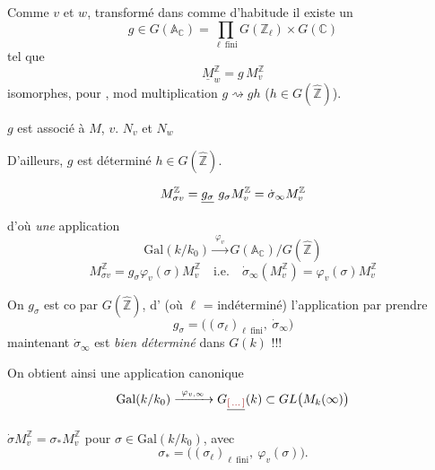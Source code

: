 \documentclass[11pt,a4paper]{article}
\begin{document}

Comme \ill{} $v$ et $w$, \ill{} transformé dans  comme d'habitude
\ill{} il existe un
\[
  g \in G(\mathbb{A}_{\mathbb{C}}) = \prod_{\ell\ \mathrm{fini}} G(\mathbb{Z}_{\ell}) \times G(\mathbb{C})
\]
 tel que
\[
  \underline{M}^{\mathbb{Z}}_{w} = g\, M^{\mathbb{Z}}_{v}
\]
 \ill{} isomorphes, \ill{} pour \ill{}, mod
multiplication $g \rightsquigarrow gh$ ($h \in G(\widehat{\mathbb{Z}})$).

$g$ est \ill{} associé à $M$, $v$. \ill{} $N_{v}$ et $N_{w}$ \ill{}

D'ailleurs, $g$ est déterminé \ill{} $h \in G(\widehat{\mathbb{Z}})$.


\[
  M^{\mathbb{Z}}_{\sigma v} = \struck{g_{\sigma}}\ g_{\sigma} M^{\mathbb{Z}}_{v}
  = \dot\sigma_{\infty} M^{\mathbb{Z}}_{v}
\]
d'où \ill{} \emph{une} application
\[
  \mathrm{Gal}(k/k_{0}) \xrightarrow{\ \varphi_{v}\ } G(\mathbb{A}_{\mathbb{C}})/G(\widehat{\mathbb{Z}})
\]
\[
  M^{\mathbb{Z}}_{\sigma v} = g_{\sigma} \varphi_{v}(\sigma) M^{\mathbb{Z}}_{v}
  \quad\text{i.e.}\quad
  \dot\sigma_{\infty}(M^{\mathbb{Z}}_{v}) = \varphi_{v}(\sigma) M^{\mathbb{Z}}_{v}
\]



On \ill{} $g_{\sigma}$ est \ill{} co\ill{} par $G(\widehat{\mathbb{Z}})$,
d'\ill{} (où \ill{} $\ell$ = indéterminé) \ill{} l'application \ill{} par
prendre
\[
  g_{\sigma} = \bigl((\sigma_{\ell})_{\ell\ \mathrm{fini}},\ \dot\sigma_{\infty}\bigr)
\]
\ill{} maintenant $\dot\sigma_{\infty}$ est \ill{} \emph{bien déterminé} dans
$G(k)$ !!!

On obtient ainsi une application canonique
\[
  \mathrm{Gal}(k/k_{0}) \xrightarrow{\ \varphi_{v,\infty}\ } G_{\struck{\ill{}}}(k)
  \subset GL\bigl(M_{k}(\infty)\bigr)
\]

 $\dot\sigma M^{\mathbb{Z}}_{v} = \sigma_{*}
M^{\mathbb{Z}}_{v}$ pour $\sigma \in \mathrm{Gal}(k/k_{0})$, avec
\[
  \sigma_{*} = \bigl((\sigma_{\ell})_{\ell\ \mathrm{fini}},\ \varphi_{v}(\sigma)\bigr) .
\]
\end{document}
